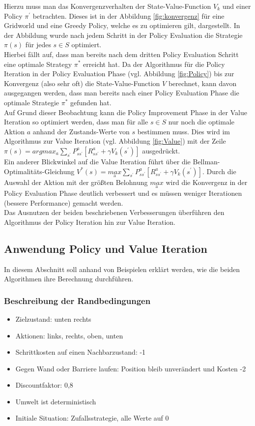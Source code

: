 \documentclass[10pt]{scrartcl}
\begin{document}
Hierzu muss man das Konvergenzverhalten der State-Value-Function $V_{k}$ und einer Policy $\pi^{'}$ betrachten.
Dieses ist in der Abbildung \ref{fig:konvergenz} für eine Gridworld und eine Greedy Policy, welche es zu optimieren gilt, dargestellt.
In der Abbildung wurde nach jedem Schritt in der Policy Evaluation die Strategie $\pi(s)$ für jedes $s \in S$ optimiert.\\
Hierbei fällt auf, dass man bereits nach dem dritten Policy Evaluation Schritt eine optimale Strategy $\pi^{*}$ erreicht hat. 
Da der Algorithmus für die Policy Iteration in der Policy Evaluation Phase (vgl. Abbildung \ref{fig:Policy}) bis zur Konvergenz (also sehr oft) die State-Value-Function $V$ berechnet, kann davon ausgegangen werden, dass man bereits nach einer Policy Evaluation Phase die optimale Strategie $\pi^{*}$ gefunden hat.\\
Auf Grund dieser Beobachtung kann die Policy Improvement Phase in der Value Iteration so optimiert werden, dass man für alle $s \in S$ nur noch die optimale Aktion $a$ anhand der Zustands-Werte von $s$ bestimmen muss.
Dies wird im Algorithmus zur Value Iteration (vgl. Abbildung \ref{fig:Value}) mit der Zeile $\pi(s) = argmax_{a} \sum_{s^{'}} P^a_{ss^{'}} [R^a_{ss^{'}} + \gamma V_{k} (s^{'})]$ ausgedrückt.\\

Ein anderer Blickwinkel auf die Value Iteration führt über die Bellman-Optimalitäts-Gleichung $V^{*}(s) = \underset{\text{a}}{max} \sum_{s^{'}} P^a_{ss^{'}} [R^a_{ss^{'}} + \gamma V_{k} (s^{'})]$.
Durch die Auswahl der Aktion mit der größten Belohnung $\underset{\text{a}}{max}$ wird die Konvergenz in der Policy Evaluation Phase deutlich verbessert und es müssen weniger Iterationen (bessere Performance) gemacht werden.\\

Das Ausnutzen der beiden beschriebenen Verbesserungen überführen den Algorithmus der Policy Iteration hin zur Value Iteration. 

\subsection{Anwendung Policy und Value Iteration}
In diesem Abschnitt soll anhand von Beispielen erklärt werden, wie die beiden Algorithmen ihre Berechnung durchführen.

\subsubsection{Beschreibung der Randbedingungen}
\begin{itemize}
	\item Zielzustand: unten rechts
	\item Aktionen: links, rechts, oben, unten
	\item Schrittkosten auf einen Nachbarzustand: -1
	\item Gegen Wand oder Barriere laufen: Position bleib unverändert und Kosten -2
	\item Discountfaktor: 0,8
	\item Umwelt ist deterministisch
	\item Initiale Situation: Zufallsstrategie, alle Werte auf 0
\end{itemize}
\end{document}
